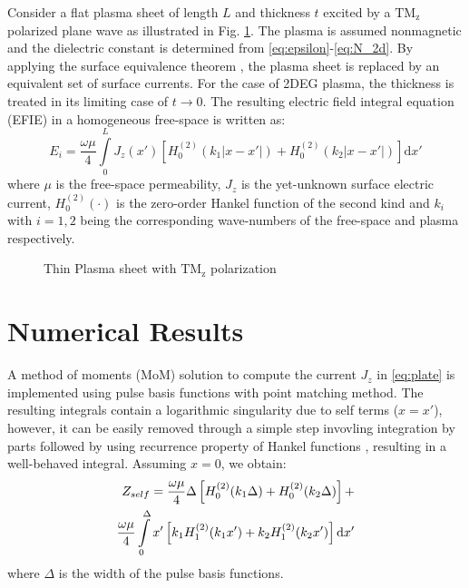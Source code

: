\documentclass[conference, 10pt]{IEEEtran}
\renewcommand{\O}{\omega}  %
\renewcommand{\u}{\mu}  %
\renewcommand{\^}{\hat}  %
\begin{document}
Consider a flat plasma sheet of length $L$ and thickness $t$ excited by a $\mathrm{TM_z}$ polarized plane wave as illustrated in Fig. \ref{fig:plate}. The plasma is assumed nonmagnetic and the dielectric constant is determined from \eqref{eq:epsilon}-\eqref{eq:N_2d}. By applying the surface equivalence theorem \cite[p. 328-333]{balanis2012advanced}, the plasma sheet is replaced by an equivalent set of surface currents. For the case of 2DEG plasma, the thickness is treated in its limiting case of $t \to 0$. The resulting electric field integral equation (EFIE) in a homogeneous free-space is written as:
%
\begin{equation}
  E_i = \frac{\O \u}{4} \int \limits_{0}^{L} J_z(x') \left[ H_0^{(2)}(k_1 |x - x'|) + H_0^{(2)}(k_2 |x - x'|)\right] \mathrm{d}x'
  \label{eq:plate}
\end{equation}
%
where $\mu$ is the free-space permeability, $J_z$ is the yet-unknown surface electric current, $H_0^{(2)}(\cdot)$ is the zero-order Hankel function of the second kind and $k_i$ with $i = 1,2$ being the corresponding wave-numbers of the free-space and plasma respectively.
%
%
\begin{figure}[h]
  \normalsize
  \centering
  
  \caption{Thin Plasma sheet with $\mathrm{TM_z}$ polarization}
  \label{fig:plate}
\end{figure}
%
\section{Numerical Results}
%
A method of moments (MoM) solution to compute the current $J_z$ in \eqref{eq:plate} is implemented using pulse basis functions with point matching method. The resulting integrals contain a logarithmic singularity due to self terms ($ x = x'$), however, it can be easily removed through a simple step invovling integration by parts followed by using recurrence property of Hankel functions \cite[p. 361]{amari1995efficient,abramowitz1968handbook}, resulting in a well-behaved integral. Assuming $x = 0$, we obtain:
%
\begin{align}
  Z_{self} = \frac{\O \u}{4} \Delta \left[H_0^{(2)}(k_1 \Delta) +  H_0^{(2)}(k_2 \Delta)\right] + \notag\\
  \frac{\O \u}{4} \int \limits_{0}^{\Delta} x'\left[ k_1 H_1^{(2)}(k_1 x')  + k_2 H_1^{(2)}(k_2 x')\right] \mathrm{d}x'
  \label{eq:self}
\end{align}
%
where $\Delta$ is the width of the pulse basis functions.
%
\end{document}
